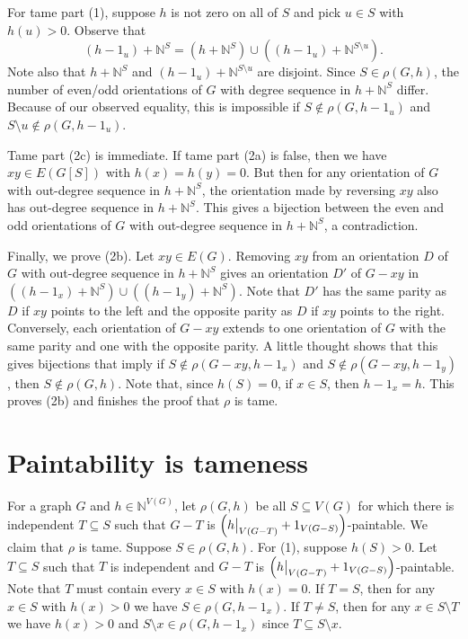 \documentclass[12pt]{article}
\theoremstyle{plain}
\theoremstyle{definition}
\theoremstyle{remark}
\newcommand{\IN}{\mathbb{N}}
\newcommand{\parens}[1]{\left( #1 \right)}
\newcommand\restr[2]{{%
  \left.\kern-\nulldelimiterspace %
  #1 %
  \vphantom{\big|} %
  \right|_{#2} %
  }}
\begin{document}
For tame part (1), suppose $h$ is not zero on all of $S$ and pick $u \in S$ with $h(u) > 0$.  Observe that 
\[(h - 1_u) + \IN^S = (h + \IN^S) \cup ((h - 1_u) + \IN^{S \setminus u}).\]
Note also that $h + \IN^S$ and $(h - 1_u) + \IN^{S \setminus u}$ are disjoint.  Since $S \in \rho(G, h)$, the number of even/odd orientations of $G$ with degree sequence in $h + \IN^S$ differ.  Because of our observed equality, this is impossible if $S \not \in \rho(G, h - 1_u)$ and $S \setminus u \not \in \rho(G, h - 1_u)$. 

Tame part (2c) is immediate.  If tame part (2a) is false, then we have $xy \in E(G[S])$ with $h(x) = h(y) = 0$.  But then for any orientation of $G$ with out-degree sequence in $h + \IN^S$, the orientation made by reversing $xy$ also has out-degree sequence in $h + \IN^S$.  This gives a bijection between the even and odd orientations of $G$ with out-degree sequence in $h + \IN^S$, a contradiction.

Finally, we prove (2b).  Let $xy \in E(G)$.  Removing $xy$ from an orientation $D$ of $G$ with out-degree sequence in $h + \IN^S$ gives an orientation $D'$ of $G-xy$ in $((h - 1_x) + \IN^S) \cup ((h - 1_y) + \IN^S)$.  Note that $D'$ has the same parity as $D$ if $xy$ points to the left and the opposite parity as $D$ if $xy$ points to the right.  Conversely, each orientation of $G-xy$ extends to one orientation of $G$ with the same parity and one with the opposite parity.  A little thought shows that this gives bijections that imply if $S \not \in \rho(G-xy, h - 1_x)$ and $S \not \in \rho(G-xy, h - 1_y)$, then $S \not \in \rho(G, h)$.  Note that, since $h(S)=0$, if $x \in S$, then $h - 1_x = h$.  This proves (2b) and finishes the proof that $\rho$ is tame.

\section{Paintability is tameness}
For a graph $G$ and $h \in \IN^{V(G)}$, let $\rho(G,h)$ be all $S \subseteq V(G)$ for which there is independent $T \subseteq S$ such that $G-T$ is $\parens{\restr{h}{V(G-T)} + 1_{V(G-S)}}$-paintable.  We claim that $\rho$ is tame.  Suppose $S \in \rho(G,h)$. For (1), suppose $h(S)>0$.  Let $T \subseteq S$ such that $T$ is independent and $G-T$ is $\parens{\restr{h}{V(G-T)} + 1_{V(G-S)}}$-paintable.  Note that $T$ must contain every $x \in S$ with $h(x)=0$.  If $T=S$, then for any $x \in S$ with $h(x)>0$ we have $S \in \rho(G, h - 1_x)$.  If $T \ne S$, then for any $x \in S \setminus T$ we have $h(x) > 0$ and $S\setminus x \in \rho(G, h - 1_x)$ since $T \subseteq S\setminus x$.
\end{document}
